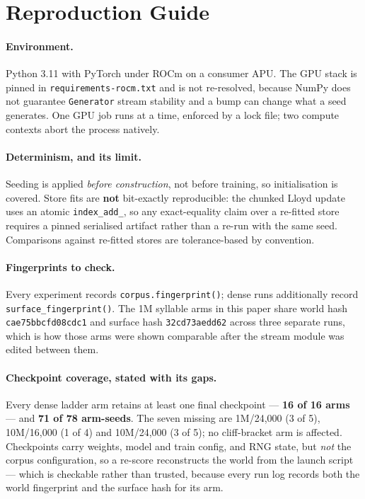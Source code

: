 \section{Reproduction Guide}
\label{app:repro}

\paragraph{Environment.} Python 3.11 with PyTorch under ROCm on a consumer APU. The GPU stack is
pinned in \texttt{requirements-rocm.txt} and is not re-resolved, because NumPy does not guarantee
\texttt{Generator} stream stability and a bump can change what a seed generates. One GPU job runs at
a time, enforced by a lock file; two compute contexts abort the process natively.

\paragraph{Determinism, and its limit.} Seeding is applied \emph{before construction}, not before
training, so initialisation is covered. Store fits are \textbf{not} bit-exactly reproducible: the
chunked Lloyd update uses an atomic \texttt{index\_add\_}, so any exact-equality claim over a
re-fitted store requires a pinned serialised artifact rather than a re-run with the same seed.
Comparisons against re-fitted stores are tolerance-based by convention.

\paragraph{Fingerprints to check.} Every experiment records \texttt{corpus.fingerprint()}; dense runs
additionally record \texttt{surface\_fingerprint()}. The 1M syllable arms in this paper share world
hash \texttt{cae75bbcfd08cdc1} and surface hash \texttt{32cd73aedd62} across three separate runs,
which is how those arms were shown comparable after the stream module was edited between them.

\paragraph{Checkpoint coverage, stated with its gaps.} Every dense ladder arm retains at least one
final checkpoint --- \textbf{16 of 16 arms} --- and \textbf{71 of 78 arm-seeds}. The seven missing
are 1M/24{,}000 (3 of 5), 10M/16{,}000 (1 of 4) and 10M/24{,}000 (3 of 5); no cliff-bracket arm is
affected. Checkpoints carry weights, model and train config, and RNG state, but \emph{not} the
corpus configuration, so a re-score reconstructs the world from the launch script --- which is
checkable rather than trusted, because every run log records both the world fingerprint and the
surface hash for its arm.

